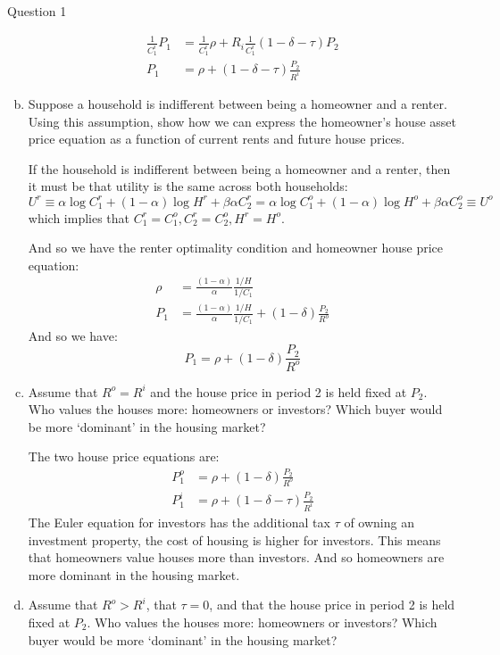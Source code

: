 \documentclass[a4paper]{article}
\begin{document}
\begin{questionbox}{Question 1}
\begin{enumerate}[(a)]
\begin{explanationbox}
\begin{align*}
				\frac{1}{C_1^i} P_1 &= \frac{1}{C_1^i}\rho + R_i\frac{1}{C_1^i}(1-\delta-\tau)P_2\\
				P_1 &= \rho + (1-\delta-\tau)\frac{P_2}{R^i}
			\end{align*}
			\end{explanationbox}
			\item Suppose a household is indifferent between being a homeowner and a renter. Using this assumption, show how we can express the homeowner's house asset price equation as a function of current rents and future house prices.
			\begin{explanationbox}
			If the household is indifferent between being a homeowner and a renter, then it must be that utility is the same across both households:
			\[
				U^r \equiv \alpha\log C_1^r + (1-\alpha)\log H^r + \beta\alpha C_2^r = \alpha\log C_1^o + (1-\alpha)\log H^o + \beta\alpha C_2^o \equiv U^o
			\]
			which implies that \( C_1^r = C_1^o, C_2^r = C_2^o, H^r = H^o \).
		\end{explanationbox}
		\begin{explanationbox}
			And so we have the renter optimality condition and homeowner house price equation:
			\begin{align*}
				\rho &=\frac{(1-\alpha)}{\alpha} \frac{1/H}{1/C_1} \\
				P_1 &= \frac{(1-\alpha)}{\alpha}\frac{1/H}{1/C_1}+(1-\delta)\frac{P_2}{R^o}
			\end{align*}
			And so we have:
			\[
			P_1 = \rho + (1 - \delta )\frac{P_2}{R^o}
			\]
			\end{explanationbox}
			\item Assume that \( R^o = R^i \) and the house price in period 2 is held fixed at \( P_2 \). Who values the houses more: homeowners or investors? Which buyer would be more `dominant' in the housing market?
			\begin{explanationbox}
			The two house price equations are:
			\begin{align*}
				P_1^o &= \rho + (1 - \delta )\frac{P_2}{R^o} \\
				P_1^i &= \rho + (1 - \delta - \tau )\frac{P_2}{R^i}
			\end{align*}
			The Euler equation for investors has the additional tax \( \tau \) of owning an investment property, the cost of housing is higher for investors. This means that homeowners value houses more than investors. And so homeowners are more dominant in the housing market.
			\end{explanationbox}
			\item Assume that \( R^o > R^i \), that \( \tau = 0 \), and that the house price in period 2 is held fixed at \( P_2 \). Who values the houses more: homeowners or investors? Which buyer would be more `dominant' in the housing market?

\end{enumerate}
\end{questionbox}
\end{document}
